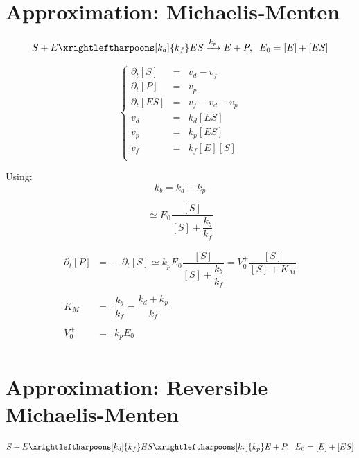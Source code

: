 \documentclass[aps,12pt]{revtex4}
\begin{document}
\section{Approximation: Michaelis-Menten}

\begin{equation}
 S + E \xrightleftharpoons[k_d]{k_f} ES \xrightarrow[]{k_p} E + P,\;\; E_0 = [E] + [ES]
\end{equation}

\begin{equation}
\left\lbrace
\begin{array}{ccl}
\partial_t [S]  & = & v_d - v_f\\
\partial_t [P]  & = & v_p \\
\partial_t [ES] & = & v_f - v_d - v_p\\
v_d & = & k_d [ES]\\ 
v_p & = & k_p [ES]\\
v_f & = & k_f [E][S]\\
\end{array}
\right.
\end{equation}

Using:
\begin{equation}
k_b = k_d + k_p
\end{equation}

\begin{equation}
	[ES] \simeq E_0 \dfrac{[S]}{[S]+\dfrac{k_b}{k_f}}
\end{equation}

\begin{equation}
\boxed{
\begin{array}{rcl}
	\partial_t [P] & = & -\partial_t [S] \simeq k_p E_0 \dfrac{[S]}{[S]+\dfrac{k_b}{k_f}} = V_0^+\dfrac{[S]}{[S]+K_M}\\
	\\
	 K_M & = & \dfrac{k_b}{k_f} = \dfrac{k_d+k_p}{k_f}\\
	 \\
	 V_0^+ & = & k_p E_0\\
\end{array}
	}
\end{equation}

\newpage 

\section{Approximation: Reversible Michaelis-Menten}

\begin{equation}
 S + E \xrightleftharpoons[k_d]{k_f} ES \xrightleftharpoons[k_r]{k_p} E + P,\;\; E_0 = [E] + [ES]
\end{equation}
\end{document}
